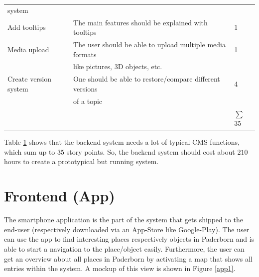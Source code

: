 \begin{table}[h]
\begin{tabular}{lll}
  	 system				& 												&	   \\
	Add tooltips			&	The main features should be explained with tooltips	&	1 \\
	Media upload			&	The user should be able to upload multiple media formats	&	1 \\
	  	 				& 	like pictures, 3D objects, etc.						&	   \\
	Create version system	&	One should be able to restore/compare different versions &	4 \\	
		  	 			& 	of a topic										&	   \\
				  	 	& 												& $\sum$ $35$   \\
	\bottomrule
 \end{tabular}
 \label{tab:costBackend}
 \end{table} 

Table \ref{tab:costBackend} shows that the backend system needs a lot of typical \ac{CMS} functions, which sum up to $35$ story points. So, the backend system should cost about $210$ hours to create a prototypical but running system. 

\clearpage

\section{Frontend (App)}
The smartphone application is the part of the system that gets shipped to the end-user (respectively downloaded via an App-Store like Google-Play). The user can use the app to find interesting places respectively objects in Paderborn and is able to start a navigation to the place/object easily. Furthermore, the user can get an overview about all places in Paderborn by activating a map that shows all entries within the system. A mockup of this view is shown in Figure \ref{app1}. 

